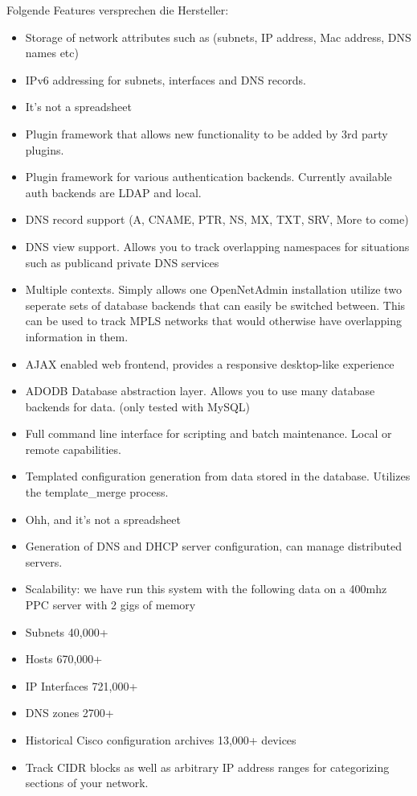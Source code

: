 \documentclass[11pt,a4paper,parskip=half]{scrartcl}
\begin{document}
Folgende Features versprechen die Hersteller:
\begin{itemize}
\item{Storage of network attributes such as (subnets, IP address, Mac address, DNS names etc)}
\item{IPv6 addressing for subnets, interfaces and DNS records.}
\item{It's not a spreadsheet}
\item{Plugin framework that allows new functionality to be added by 3rd party plugins.}
\item{Plugin framework for various authentication backends. Currently available auth backends are LDAP and local.}
\item{DNS record support (A, CNAME, PTR, NS, MX, TXT, SRV, More to come)}
\item{DNS view support. Allows you to track overlapping namespaces for situations such as publicand private DNS services}
\item{Multiple contexts. Simply allows one OpenNetAdmin installation utilize two seperate sets of database backends that can easily be switched between. This can be used to track MPLS networks that would otherwise have overlapping information in them.}
\item{AJAX enabled web frontend, provides a responsive desktop-like experience}
\item{ADODB Database abstraction layer. Allows you to use many database backends for data. (only tested with MySQL)}
\item{Full command line interface for scripting and batch maintenance. Local or remote capabilities.}
\item{Templated configuration generation from data stored in the database. Utilizes the template\_merge process.}
\item{Ohh, and it's not a spreadsheet}
\item{Generation of DNS and DHCP server configuration, can manage distributed servers.}
\item{Scalability: we have run this system with the following data on a 400mhz PPC server with 2 gigs of memory}
\item{Subnets	40,000+}
\item{Hosts	670,000+}
\item{IP Interfaces	721,000+}
\item{DNS zones	2700+}
\item{Historical Cisco configuration archives	13,000+ devices}
\item{Track CIDR blocks as well as arbitrary IP address ranges for categorizing sections of your network.}

\end{itemize}
\end{document}
